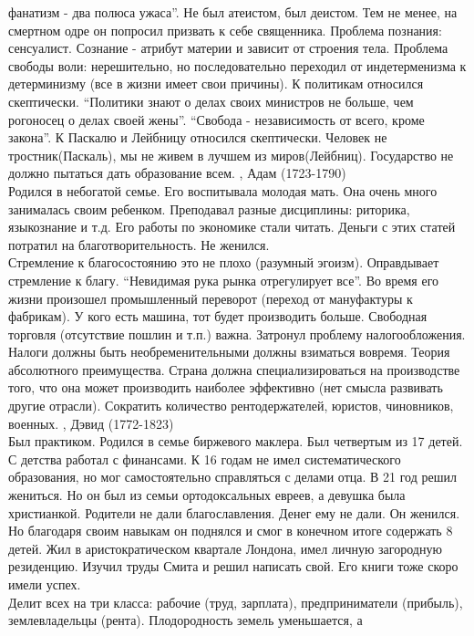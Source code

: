\documentclass[a4paper,12pt]{report} %
\begin{document}
\begin{itemize}
  фанатизм - два полюса ужаса''. Не был атеистом, был деистом. Тем не менее, на
  смертном одре он попросил призвать к себе священника. Проблема
  познания: сенсуалист. Сознание - атрибут материи и зависит от строения
  тела. Проблема свободы воли: нерешительно, но последовательно
  переходил от индетерменизма к детерминизму (все в жизни имеет свои
  причины). К политикам относился скептически. ``Политики знают о делах
  своих министров не больше, чем рогоносец о делах своей жены''. ``Свобода -
  независимость от всего, кроме закона''. К Паскалю и Лейбницу относился
  скептически. Человек не тростник(Паскаль), мы не живем в  лучшем из
  миров(Лейбниц). Государство не должно пытаться дать образование всем.
, Адам (1723-1790)\\
  Родился в небогатой семье. Его воспитывала молодая мать. Она очень
  много занималась своим ребенком. Преподавал разные дисциплины:
  риторика, языкознание и т.д. Его работы по экономике стали
  читать. Деньги с этих статей потратил на благотворительность. Не
  женился.\\
  Стремление к благосостоянию это не плохо (разумный
  эгоизм). Оправдывает стремление к благу. ``Невидимая рука рынка
  отрегулирует все''. Во время его жизни произошел промышленный
  переворот (переход от мануфактуры к фабрикам). У кого есть машина, тот
  будет производить больше. Свободная торговля (отсутствие пошлин и
  т.п.) важна. Затронул проблему налогообложения. Налоги должны быть
  необременительными должны взиматься вовремя. Теория абсолютного
  преимущества. Страна должна специализироваться на производстве того,
  что она может производить наиболее эффективно (нет смысла развивать
  другие отрасли). Сократить количество рентодержателей, юристов,
  чиновников, военных.
, Дэвид (1772-1823)\\
  Был практиком. Родился в семье биржевого маклера. Был четвертым из 17
  детей. С детства работал с финансами. К 16 годам не имел
  систематического образования, но мог самостоятельно справляться с
  делами отца. В 21 год решил жениться. Но он был из семьи
  ортодоксальных евреев, а девушка была христианкой. Родители не дали
  благославления. Денег ему не дали. Он женился. Но благодаря своим
  навыкам он поднялся и смог в конечном итоге содержать 8 детей. Жил в
  аристократическом квартале Лондона, имел личную загородную
  резиденцию. Изучил труды Смита и решил написать свой. Его книги тоже
  скоро имели успех.\\
  Делит всех на три класса: рабочие (труд, зарплата), предприниматели
  (прибыль), землевладельцы (рента). Плодородность земель уменьшается, а

\end{itemize}
\end{document}
